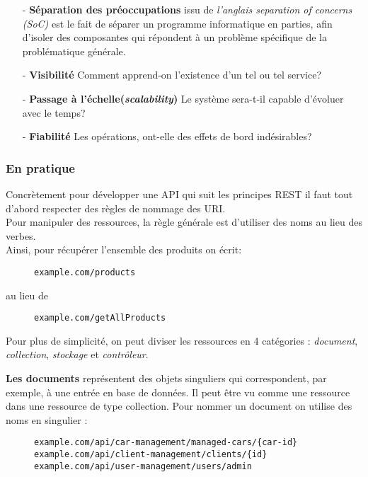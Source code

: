 \begin{itemize}
	\item [- \textbf{Séparation des préoccupations}] issu de \emph{l’anglais separation of concerns (SoC)} est le fait de séparer un programme informatique en parties, afin d'isoler des composantes qui répondent à un problème spécifique de la problématique générale.  
	\item [- \textbf{Visibilité}] Comment apprend-on l'existence d'un tel ou tel service? 
	\item [- \textbf{Passage à l'échelle(\emph{scalability})}] Le système sera-t-il capable d'évoluer avec le temps?
	\item [- \textbf{Fiabilité}] Les opérations, ont-elle des effets de bord indésirables? \cite{rest}
\end{itemize}


\subsubsection{En pratique}
Concrètement pour développer une API qui suit les principes REST il faut tout d'abord respecter des règles de nommage des URI. \\
Pour manipuler des ressources, la règle générale est d'utiliser des noms au lieu des verbes.\\
Ainsi, pour récupérer l'ensemble des produits on écrit:
\begin{figure}[h!]
	\begin{lstlisting}[frame=leftline]
example.com/products
	\end{lstlisting}
\end{figure}

au lieu de 


\begin{figure}[h!]
	\begin{lstlisting}[frame=leftline]
example.com/getAllProducts
	\end{lstlisting}
\end{figure}
 
Pour plus de simplicité, on peut diviser les ressources en 4 catégories : \emph{document}, \emph{collection}, \emph{stockage} et \emph{contrôleur}. 

\textbf{Les documents} représentent des objets singuliers qui  correspondent, par exemple, à une entrée en base de données. Il peut être vu comme une ressource dans une ressource de type collection. Pour nommer un document on utilise des noms en singulier : 
\begin{figure}[h!]
	\begin{lstlisting}[frame=leftline]
example.com/api/car-management/managed-cars/{car-id}
example.com/api/client-management/clients/{id}
example.com/api/user-management/users/admin
	\end{lstlisting}
\end{figure}

